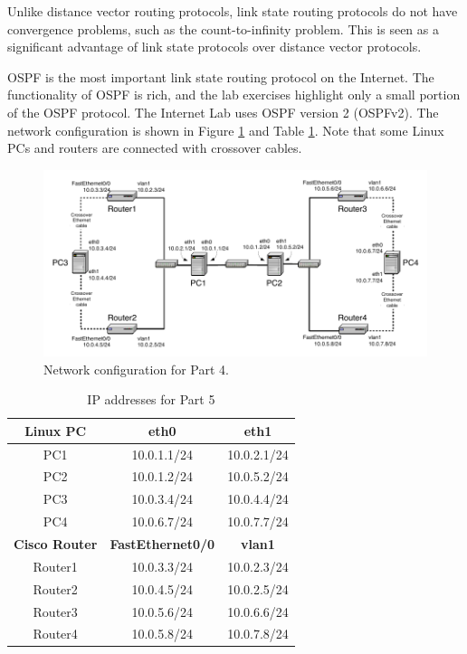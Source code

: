 Unlike distance vector routing protocols, link state routing protocols do not have convergence problems, such as the count-to-infinity problem. This is seen as a significant advantage of link state protocols over distance vector protocols.

OSPF is the most important link state routing protocol on the Internet. The functionality of OSPF is rich, and the lab exercises highlight only a small portion of the OSPF protocol. The Internet Lab uses OSPF version 2 (OSPFv2).
The network configuration is shown in Figure \ref{fig:lab4-network2} and Table \ref{tab:lab4-network2}. Note that some Linux PCs and routers are connected with crossover cables.

\begin{figure}[ht]
	\centering
	\includegraphics[width=\linewidth]{graphics/lab4-network2-updated.pdf}	
	\caption{Network configuration for Part 4.}
	\label{fig:lab4-network2}
\end{figure}

\begin{table}[h!t]
	\centering
	\begin{tabular}{| c | c | c |}	
		\hline
		\textbf{Linux PC} & \textbf{eth0} & \textbf{eth1} \\ \hline
		PC1 & 10.0.1.1/24 & 10.0.2.1/24 \\ 
		PC2 & 10.0.1.2/24 & 10.0.5.2/24 \\
		PC3 & 10.0.3.4/24 & 10.0.4.4/24 \\
		PC4 & 10.0.6.7/24 & 10.0.7.7/24 \\ \hline
		\textbf{Cisco Router} & \textbf{FastEthernet0/0} & \textbf{vlan1} \\ \hline
		Router1 & 10.0.3.3/24 & 10.0.2.3/24 \\
		Router2 & 10.0.4.5/24 & 10.0.2.5/24 \\
		Router3 & 10.0.5.6/24 & 10.0.6.6/24 \\
		Router4 & 10.0.5.8/24 & 10.0.7.8/24 \\ \hline
	\end{tabular}
	\caption{IP addresses for Part 5}
	\label{tab:lab4-network2}
\end{table}

